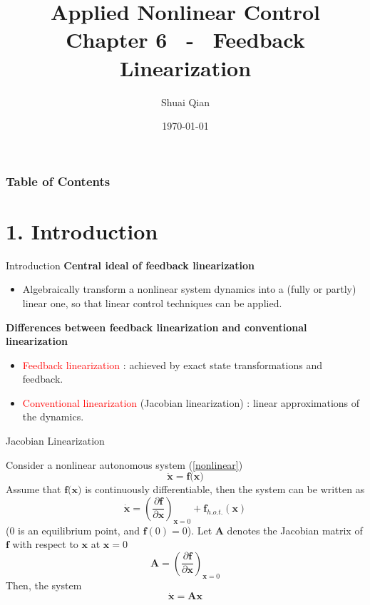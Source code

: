 \documentclass{beamer}
\title{Applied Nonlinear Control \\
        \large Chapter 6 ~-~ Feedback Linearization}
\author{\large Shuai Qian}
\date{\today}
\institute{School of Automation \\
        Nanjing University of Science and Technology}
\begin{document}
  \maketitle

  \begin{frame}
  \addtocounter{framenumber}{-2}
  \frametitle{Table of Contents}
  \thispagestyle{empty}
  \tableofcontents
  \end{frame}


  \section{1. Introduction}

  \begin{frame}{Introduction}
    \textbf{Central ideal of feedback linearization}
    \begin{itemize}
      \item Algebraically transform a nonlinear system dynamics into a (fully or partly) linear one, so that linear control techniques can be applied.
    \end{itemize}

    \textbf{Differences between feedback linearization and conventional linearization}
    \begin{itemize}
      \item \textcolor{red}{Feedback linearization} : achieved by exact state transformations and feedback.
      \item \textcolor{red}{Conventional linearization} (Jacobian linearization) : linear approximations of the dynamics.
    \end{itemize}
   \end{frame}


   \begin{frame}{Jacobian Linearization}

    Consider a nonlinear autonomous system (\ref{nonlinear})
    \begin{equation}\label{nonlinear}
      \dot{\textbf{x}} = \textbf{f(x)}
    \end{equation}
    Assume that $\textbf{f(x)}$ is continuously differentiable,
    then the system can be written as
    $$
    \dot{\textbf{x}} = (\frac{\partial \textbf{f}}{\partial \textbf{x}})_{\textbf{x}=0} + \textbf{f}_{h.o.t.}(\textbf{x})
    $$
    (0 is an equilibrium point, and $\textbf{f}(0) = 0$).
    Let $\textbf{A}$ denotes the Jacobian matrix of $\textbf{f}$ with respect to $\textbf{x}$ at $\textbf{x}=0$
    $$
    \textbf{A} = (\frac{\partial \textbf{f}}{\partial \textbf{x}})_{\textbf{x}=0}
    $$
    Then, the system
    $$
    \dot{\textbf{x}} = \textbf{Ax}
    $$
   \end{frame}
\end{document}
